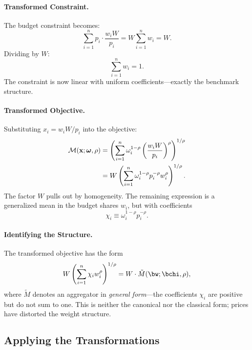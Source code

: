 \paragraph{Transformed Constraint.}
The budget constraint becomes:
\[
\sum_{i=1}^{n} p_i \cdot \frac{w_i W}{p_i} = W \sum_{i=1}^{n} w_i = W.
\]
Dividing by $W$:
\begin{equation}
\label{eq:transformed-constraint}
\sum_{i=1}^{n} w_i = 1.
\end{equation}
The constraint is now linear with uniform coefficients---exactly the benchmark structure.

\paragraph{Transformed Objective.}
Substituting $x_i = w_i W / p_i$ into the objective:
\begin{align}
\mathcal{M}(\mathbf{x}; \boldsymbol{\omega}, \rho) &= \left( \sum_{i=1}^{n} \omega_i^{1-\rho} \left( \frac{w_i W}{p_i} \right)^\rho \right)^{1/\rho} \notag \\
&= W \left( \sum_{i=1}^{n} \omega_i^{1-\rho} p_i^{-\rho} w_i^\rho \right)^{1/\rho}.
\label{eq:transformed-objective}
\end{align}
The factor $W$ pulls out by homogeneity. The remaining expression is a generalized mean in the budget shares $w_i$, but with coefficients
\begin{equation}
\label{eq:chi-def}
\chi_i \equiv \omega_i^{1-\rho} p_i^{-\rho}.
\end{equation}

\paragraph{Identifying the Structure.}
The transformed objective has the form
\begin{equation}
\label{eq:general-form}
W \left( \sum_{i=1}^{n} \chi_i w_i^\rho \right)^{1/\rho} = W \cdot \tilde{M}(\bw; \bchi, \rho),
\end{equation}
where $\tilde{M}$ denotes an aggregator in \emph{general form}---the coefficients $\chi_i$ are positive but do not sum to one. This is neither the canonical nor the classical form; prices have distorted the weight structure.

\subsection{Applying the Transformations}
\label{subsec:applying-transforms}

